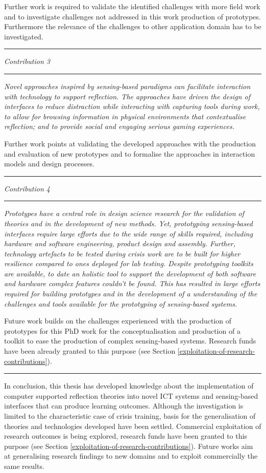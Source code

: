 Further work is required to validate the identified challenges with more field work and to investigate challenges not addressed in this work production of prototypes. Furthermore the relevance of the challenges to other application domain has to be investigated. \rule{
\textwidth}{.1pt} \medskip

\emph{Contribution 3} 
\newline \rule{
\textwidth}{.1pt} \emph{Novel approaches inspired by sensing-based paradigms can facilitate interaction with technology to support reflection. The approaches have driven the design of interfaces to reduce distraction while interacting with capturing tools during work, to allow for browsing information in physical environments that contextualise reflection; and to provide social and engaging serious gaming experiences.}

Further work points at validating the developed approaches with the production and evaluation of new prototypes and to formalise the approaches in interaction models and design processes.

\rule{
\textwidth}{.1pt}

\medskip

\emph{Contribution 4} 
\newline \rule{
\textwidth}{.1pt} \emph{Prototypes have a central role in design science research for the validation of theories and in the development of new methods. Yet, prototyping sensing-based interfaces require large efforts due to the wide range of skills required, including hardware and software engineering, product design and assembly. Further, technology artefacts to be tested during crisis work are to be built for higher resilience compared to ones deployed for lab testing. Despite prototyping toolkits are available, to date an holistic tool to support the development of both software and hardware complex features couldn't be found. This has resulted in large efforts required for building prototypes and in the development of a understanding of the challenges and tools available for the prototyping of sensing-based systems.}

Future work builds on the challenges experienced with the production of prototypes for this PhD work for the conceptualisation and production of a toolkit to ease the production of complex sensing-based systems. Research funds have been already granted to this purpose (see Section \ref{exploitation-of-research-contributions}).

\rule{
\textwidth}{.1pt}

\bigskip

In conclusion, this thesis has developed knowledge about the implementation of computer supported reflection theories into novel ICT systems and sensing-based interfaces that can produce learning outcomes. Although the investigation is limited to the characteristic case of crisis training, basis for the generalisation of theories and technologies developed have been settled. Commercial exploitation of research outcomes is being explored, research funds have been granted to this purpose (see Section \ref{exploitation-of-research-contributions}). Future works aim at generalising research findings to new domains and to exploit commercially the same results. 

